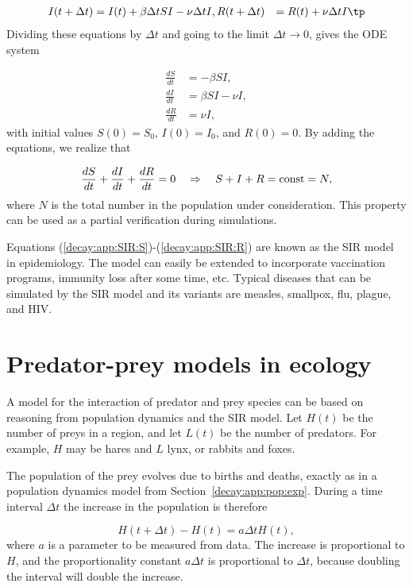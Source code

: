 \documentclass[graybox,sectrefs,envcountresetchap,open=right,final]{svmonodo}
\begin{document}
\begin{align*}
I(t+\Delta t) &= I(t) + \beta\Delta tSI - \nu\Delta t I,
R(t+\Delta t) &= R(t) + \nu\Delta t I\tp
\end{align*}
Dividing these equations by $\Delta t$ and going to the limit
$\Delta t\rightarrow 0$, gives the ODE system

\begin{align}
\frac{dS}{dt} &= -\beta SI,
\label{decay:app:SIR:S}\\ 
\frac{dI}{dt} &=  \beta SI - \nu I,
\label{decay:app:SIR:I}\\ 
\frac{dR}{dt} &= \nu I,
\label{decay:app:SIR:R}
\end{align}
with initial values $S(0)=S_0$, $I(0)=I_0$, and $R(0)=0$.
By adding the equations, we realize that

\[ \frac{dS}{dt}+\frac{dI}{dt}+\frac{dR}{dt}=0\quad\Rightarrow\quad
S+I+R=\hbox{const}=N,\]
where $N$ is the total number in the population under consideration.
This property can be used as a partial verification during simulations.

Equations (\ref{decay:app:SIR:S})-(\ref{decay:app:SIR:R}) are known as
the SIR model in epidemiology. The model can easily be extended to
incorporate vaccination programs, immunity loss after some time, etc.
Typical diseases that can be simulated by the SIR model and its variants
are measles, smallpox, flu, plague, and HIV.

\section{Predator-prey models in ecology}
\label{decay:app:predprey}


A model for the interaction of predator and prey species can be based
on reasoning from population dynamics and the SIR model.
Let $H(t)$ be the number of preys in a region, and let $L(t)$
be the number of predators. For example, $H$ may be hares and $L$ lynx,
or rabbits and foxes.

The population of the prey evolves due to births and deaths, exactly
as in a population dynamics model from Section~\ref{decay:app:pop:exp}.
During a time interval $\Delta t$ the increase in the population is
therefore

\[ H(t+\Delta t) - H(t) =  a\Delta t H(t),\]
where $a$ is a parameter to be measured from data.
The increase is proportional to $H$, and the proportionality constant
$a\Delta t$ is proportional to $\Delta t$, because doubling the
interval will double the increase.
\end{document}

